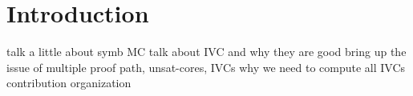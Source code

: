 \section{Introduction}
\label{sec:intro}

talk a little about symb MC
talk about IVC and why they are good
bring up the issue of multiple proof path, unsat-cores, IVCs 
why we need to compute all IVCs
contribution
organization

